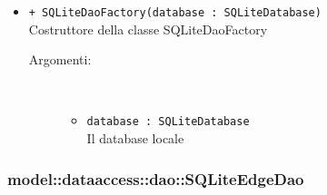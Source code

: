 \documentclass[../DefinizioneDiProdotto.tex]{subfiles}
\begin{document}
\begin{description}
\begin{itemize}
 \item \texttt{+ SQLiteDaoFactory(database : SQLiteDatabase)}\\
Costruttore della classe SQLiteDaoFactory
 \begin{description}
\item[Argomenti:] \
\begin{itemize}
\item \texttt{database : SQLiteDatabase}\\
Il database locale \end{itemize}
\end{description}
\end{itemize}
\end{description}

\subsubsection{model::dataaccess::dao::SQLiteEdgeDao}
\end{document}

